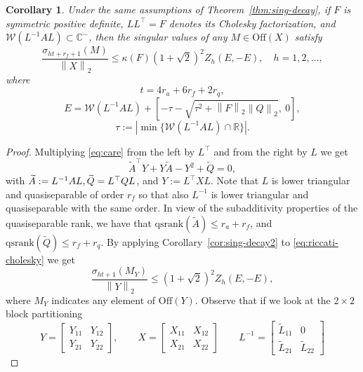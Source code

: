 \documentclass[10pt,a4paper]{amsart}
\newtheorem{corollary}{Corollary}
\newcommand{\norm}[1]{\left\lVert#1\right\rVert}
\def\qsrank{\mathrm{qsrank}}
\newcommand{\upd}[1]{{\color{black}#1}} %
\begin{document}
\begin{corollary}\label{cor:sing-decay3}
	Under the same assumptions of Theorem~\ref{thm:sing-decay}, if $F$ is symmetric positive definite, $LL^\top=F$ denotes its Cholesky factorization, and $\mathcal W(L^{-1}AL)\subset \mathbb C^-$,  then the singular values of  any $M\in\mathrm{Off}(X)$   satisfy
	$$
	\frac{\sigma_{ht+r_f+1}(M)}{\norm{X}_2}\le \kappa(F)(1+\sqrt{2})^2 Z_h(E,-E),
	\quad h=1,2,\dots,
	$$
	where $$t=4r_a+6r_f+2r_q,$$
	 $$
	 E=\mathcal W(L^{-1}AL) + \left[-\tau -\sqrt{\tau^2+\norm{F}_2\norm{Q}_2},\ 0\right],
	 $$
	   $$\tau:= |\min\{\mathcal W(L^{-1}AL)\cap \mathbb R\}|.$$   
\end{corollary}

\begin{proof}
	Multiplying \eqref{eq:care} from the left by $L^\top$ and from the right by $L$ we get
	\begin{equation}\label{eq:riccati-cholesky}
		\widetilde A^\top Y + Y\widetilde A- Y^2+ \widetilde Q=0,
	\end{equation}
	with $\widetilde A:=L^{-1}AL, \widetilde Q =L\upd{^\top}QL$, and $Y:=L^\top XL$. Note that $L$ is lower triangular and quasiseparable of order $r_f$  so that also $L^{-1}$ is lower triangular and quasiseparable with the same order. In view of the \upd{subadditivity} properties of the quasiseparable rank, we have that $\qsrank(\widetilde A)\le r_a+r_f$, and  $\qsrank(\widetilde Q)\le r_f+r_q$.
	By applying Corollary~\ref{cor:sing-decay2} to \eqref{eq:riccati-cholesky} we get 
	\begin{equation}\label{eq:Ybound}
		\frac{\sigma_{ht+1}(M_Y)}{\norm{Y}_2}\le (1+\sqrt{2})^2 Z_h(E,-E),
	\end{equation}
	where $M_Y$ indicates 
	any element of $\mathrm{Off}(Y)$. Observe that if we look at the $2\times 2$ block partitioning
	$$
	Y=\begin{bmatrix}
		Y_{11} & Y_{12}\\
		Y_{21}&Y_{22}
	\end{bmatrix}, \qquad X=\begin{bmatrix}
		X_{11} & X_{12}\\
		X_{21}&X_{22}
	\end{bmatrix}\qquad L^{-1}=\begin{bmatrix}
		\widetilde L_{11} & 0\\
		\widetilde L_{21}&\widetilde L_{22}

\end{bmatrix}$$
\end{proof}
\end{document}
